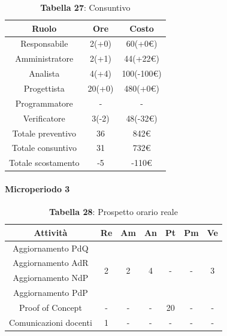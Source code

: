 \begin{table}[H]
	\centering
	\renewcommand{\arraystretch}{1.5}
	\begin{tabular}{|c|c|c|}
		\hline
		\rowcolor{lighter-grayer}
		Ruolo & Ore & Costo \\ \hline
		Responsabile & 2(+0) & 60(+0\euro) \\ \hline
		Amministratore & 2(+1) & 44(+22\euro) \\ \hline
		Analista & 4(+4) & 100(-100\euro) \\ \hline
		Progettista & 20(+0) & 480(+0\euro) \\ \hline
		Programmatore & - & - \\ \hline
		Verificatore & 3(-2) & 48(-32\euro) \\ \hline
		Totale preventivo & 36 & 842\euro \\ \hline
		Totale consuntivo & 31 & 732\euro \\ \hline
		Totale scostamento & -5 & -110\euro \\ \hline
	\end{tabular}
	\caption*{\textbf{Tabella 27}: Consuntivo\\}
\end{table}

\paragraph{Microperiodo 3}
\begin{table}[H]
	\centering
	\begin{tabular}{|c|c|c|c|c|c|c|}
		\hline
		\rowcolor{lighter-grayer}
		\textbf{Attività}     & \textbf{Re}        & \textbf{Am}        & \textbf{An}        & \textbf{Pt}        & \textbf{Pm}        & \textbf{Ve}        \\ \hline
		Aggiornamento PdQ     & \multirow{4}{*}{2} & \multirow{4}{*}{2} & \multirow{4}{*}{4} & \multirow{4}{*}{-} & \multirow{4}{*}{-} & \multirow{4}{*}{3} \\ \cline{1-1}
		Aggiornamento AdR     &                    &                    &                    &                    &                    &                    \\ \cline{1-1}
		Aggiornamento NdP     &                    &                    &                    &                    &                    &                    \\ \cline{1-1}
		Aggiornamento PdP     &                    &                    &                    &                    &                    &                    \\ \hline
		Proof of Concept                   & -                  & -                  & -                  & 20                 & -                  & -                  \\ \hline
		Comunicazioni docenti & 1                  & -                  & -                  & -                  & -                  & -                  \\ \hline
	\end{tabular}
\caption*{\textbf{Tabella 28}: Prospetto orario reale\\}
\end{table}

